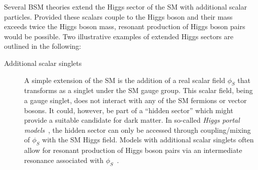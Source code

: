  Several BSM theories extend the Higgs sector of the SM
with additional scalar particles. Provided these scalars couple to the Higgs
boson and their mass exceeds twice the Higgs boson mass, resonant production of
Higgs boson pairs would be possible. Two illustrative examples of extended Higgs
sectors are outlined in the following:
\begin{description}

\item[Additional scalar singlets] A simple extension of the SM is the addition
  of a real scalar field $\phi_{S}$ that transforms as a singlet under the SM
  gauge group. This scalar field, being a gauge singlet, does not interact with
  any of the SM fermions or vector bosons. It could, however, be part of a
  ``hidden sector'' which might provide a suitable candidate for dark matter. In
  so-called \emph{Higgs portal models}~\cite{Patt:2006fw}, the hidden sector can
  only be accessed through coupling/mixing of $\phi_{S}$ with the SM Higgs
  field. Models with additional scalar singlets often allow for resonant
  production of Higgs boson pairs via an intermediate resonance associated with
  $\phi_{S}$~\cite{Schabinger:2005ei,Bowen:2007ia,Barger:2007im,Dolan:2012ac,No:2013wsa,Chen:2014ask,Robens:2016xkb,DiMicco:2019ngk}.


\end{description}
